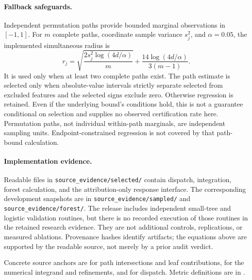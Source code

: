 \documentclass{article}
\begin{document}
\paragraph{Fallback safeguards.}
Independent permutation paths provide bounded marginal observations in $[-1,1]$. For $m$ complete paths, coordinate sample variance $s_j^2$, and $\alpha=0.05$, the implemented simultaneous radius is
\begin{equation}
 r_j=\sqrt{\frac{2s_j^2\log(4d/\alpha)}{m}}
       +\frac{14\log(4d/\alpha)}{3(m-1)}.
\end{equation}
It is used only when at least two complete paths exist. The path estimate is selected only when absolute-value intervals strictly separate selected from excluded features and the selected signs exclude zero. Otherwise regression is retained. Even if the underlying bound's conditions hold, this is not a guarantee conditional on selection and supplies no observed certification rate here. Permutation paths, not individual within-path marginals, are independent sampling units. Endpoint-constrained regression is not covered by that path-bound calculation.

\paragraph{Implementation evidence.}
Readable files in \texttt{source\_evidence/selected/} contain dispatch, integration, forest calculation, and the attribution-only response interface. The corresponding development snapshots are in \texttt{source\_evidence/sampled/} and \texttt{source\_evidence/forest/}. The release includes independent small-tree and logistic validation routines, but there is no recorded execution of those routines in the retained research evidence. They are not additional controls, replications, or measured ablations. Provenance hashes identify artifacts; the equations above are supported by the readable source, not merely by a prior audit verdict.

Concrete source anchors are  for path intersections and leaf contributions,
 for the numerical integrand and refinements,
and  for dispatch. Metric definitions are in
.
\end{document}
